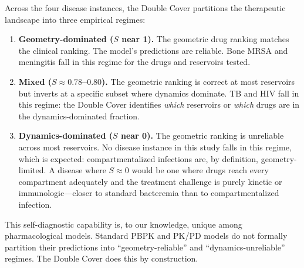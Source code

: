 \documentclass[11pt]{article}
\theoremstyle{plain}
\theoremstyle{definition}
\begin{document}
Across the four disease instances, the Double Cover partitions the
therapeutic landscape into three empirical regimes:

\begin{enumerate}
  \item \textbf{Geometry-dominated ($S$ near 1).}
    The geometric drug ranking matches the clinical ranking.
    The model's predictions are reliable. Bone MRSA and
    meningitis fall in this regime for the drugs and reservoirs
    tested.

  \item \textbf{Mixed ($S \approx 0.78$--$0.80$).}
    The geometric ranking is correct at most reservoirs but
    inverts at a specific subset where dynamics dominate. TB and
    HIV fall in this regime: the Double Cover identifies
    \emph{which} reservoirs or \emph{which} drugs are in the
    dynamics-dominated fraction.

  \item \textbf{Dynamics-dominated ($S$ near 0).}
    The geometric ranking is unreliable across most reservoirs.
    No disease instance in this study falls in this regime, which
    is expected: compartmentalized infections are, by definition,
    geometry-limited. A disease where $S \approx 0$ would be one
    where drugs reach every compartment adequately and the
    treatment challenge is purely kinetic or immunologic---closer
    to standard bacteremia than to compartmentalized infection.
\end{enumerate}

This self-diagnostic capability is, to our knowledge, unique among
pharmacological models. Standard PBPK and PK/PD models do not
formally partition their predictions into ``geometry-reliable'' and
``dynamics-unreliable'' regimes. The Double Cover does this by
construction.
\end{document}
